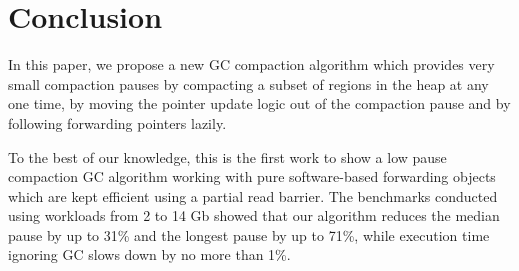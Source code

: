 \documentclass[sigplan,10pt,screen]{acmart}\settopmatter{printfolios=true,printccs=true,printacmref=true}
\def\bestMedian{31\%\xspace}
\def\bestWorst{71\%\xspace}
\begin{document}
\section{Conclusion}
\label{sec:conclusion}

In this paper, we propose a new GC compaction algorithm which provides very small compaction pauses by compacting a subset of regions in the heap at any one time, by moving the pointer update logic out of the compaction pause and by following forwarding pointers lazily. 

To the best of our knowledge, this is the first work to show a low pause compaction GC algorithm working with pure software-based forwarding objects which are kept efficient using a partial read barrier.
The benchmarks conducted using workloads from 2 to 14 Gb showed that our algorithm reduces the median pause by up to \bestMedian and the longest pause by up to \bestWorst, while execution time ignoring GC slows down by no more than 1\%.








\end{document}
